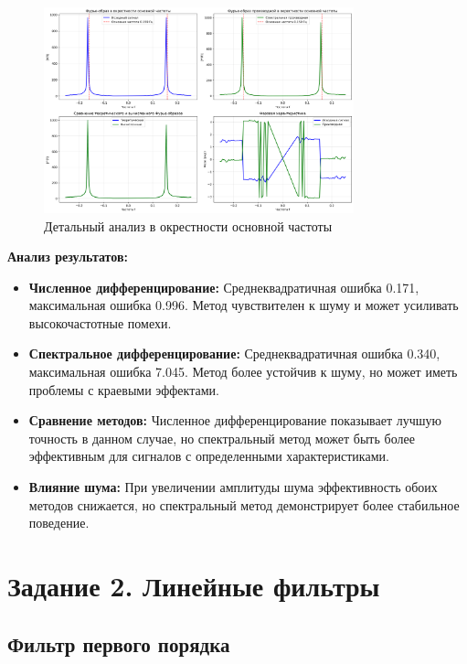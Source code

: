 \begin{figure}[H]
    \centering
    \includegraphics[width=0.8\textwidth]{images/task1/spectral_differentiation_analysis.png}
    \caption{Детальный анализ в окрестности основной частоты}
    \label{fig:spectral_diff_analysis}
\end{figure}

\textbf{Анализ результатов:}
\begin{itemize}
    \item \textbf{Численное дифференцирование:} Среднеквадратичная ошибка 0.171, максимальная ошибка 0.996. Метод чувствителен к шуму и может усиливать высокочастотные помехи.
    
    \item \textbf{Спектральное дифференцирование:} Среднеквадратичная ошибка 0.340, максимальная ошибка 7.045. Метод более устойчив к шуму, но может иметь проблемы с краевыми эффектами.
    
    \item \textbf{Сравнение методов:} Численное дифференцирование показывает лучшую точность в данном случае, но спектральный метод может быть более эффективным для сигналов с определенными характеристиками.
    
    \item \textbf{Влияние шума:} При увеличении амплитуды шума эффективность обоих методов снижается, но спектральный метод демонстрирует более стабильное поведение.
\end{itemize}

\section*{Задание 2. Линейные фильтры}

\subsection*{Фильтр первого порядка}

